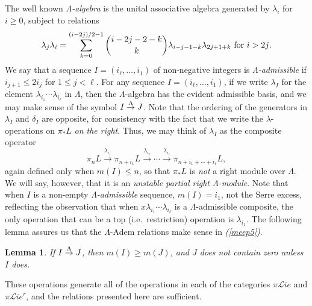 \documentclass[11pt]{amsart} \renewcommand{\baselinestretch}{1.2}
\theoremstyle{plain}
\newtheorem{lem}[thm]{Lemma}
\theoremstyle{definition}
\renewcommand{\to}{\longrightarrow}
\newcommand{\scrL}{\mathscr{L}}
\newcommand{\PA}[1]{\pi#1}
\newcommand{\minDimDelta}{m}
\newcommand{\produces}[3]{#3:#1\sim #2}
\renewcommand{\produces}[3]{#1\rightarrow_{#3} #2}%
\renewcommand{\produces}[3]{#1\overset{\smash{#3}}{\rightarrow} #2}%
\newcommand{\liealgs}{{\scrL\!\textit{ie}}}
\newcommand{\restliealgs}{{\scrL\!\textit{ie}^\textit{r}}}
\begin{document}
\begin{Constructing homotopy operations}
The well known \emph{$\Lambda$-algebra} is the unital associative algebra generated by $\lambda_i$ for $i\geq0$, subject to relations \[\lambda_j\lambda_i=\sum_{k=0}^{(i-2j)/2-1}{i-2j-2-k\choose k}\lambda_{i-j-1-k}\lambda_{2j+1+k}\textup{\ for $i>2j$.}\]
We say that a sequence $I=(i_\ell,\ldots,i_1)$ of non-negative integers is \emph{$\Lambda$-admissible} if $i_{j+1}\leq 2i_j$ for $1\leq j <\ell$. 
For any sequence $I=(i_\ell,\ldots,i_1)$, if we write $\lambda_I$ for the element $\lambda_{i_1}\cdots \lambda_{i_\ell}$ in $\Lambda$, then the $\Lambda$-algebra has the evident admissible basis, and we may make sense of the symbol $\produces{I}{J}{\Lambda}$. Note that the ordering of the generators in $\lambda_I$ and $\delta_I$ are opposite, for consistency with the fact that we write the $\lambda$-operations on $\pi_*L$ \emph{on the right}. Thus, we may think of $\lambda_I$ as the composite operator  
\[\pi_{n}L\overset{\lambda_{i_1}}{\to}\pi_{n+i_1}L\overset{\lambda_{i_2}}{\to}\cdots \overset{\lambda_{i_\ell}}{\to}\pi_{n+i_1+\cdots +i_\ell}L,\]
again defined only when $\minDimDelta(I)\leq n$, so that $\pi_*L$ is \emph{not} a right module over $\Lambda$. We will say, however, that it is an \emph{unstable partial right $\Lambda$-module}.
Note that when $I$ is a non-empty \emph{$\Lambda$-admissible} sequence,
$\minDimDelta(I)=i_1$, not the Serre excess, reflecting the observation that when $x\lambda_{i_1}\cdots \lambda_{i_\ell}$ is a $\Lambda$-admissible composite, the only operation that  can be a top (i.e.\ restriction) operation is $\lambda_{i_1}$.
The following lemma assures us that the $\Lambda$-Adem relations make sense in \emph{(\ref{meep5})}.
\begin{lem}
\label{lemOnAdemChangeInMLambdaPlain}
If $\produces{I}{J}{\Lambda}$, then $\minDimDelta(I)\geq\minDimDelta(J)$, and $J$ does not contain zero unless $I$ does.
\end{lem}
These operations generate all of the operations in each of the categories $\PA{\liealgs}$ and $\PA{\restliealgs}$, and the relations presented here are sufficient. 



\end{Constructing homotopy operations}
\end{document}
